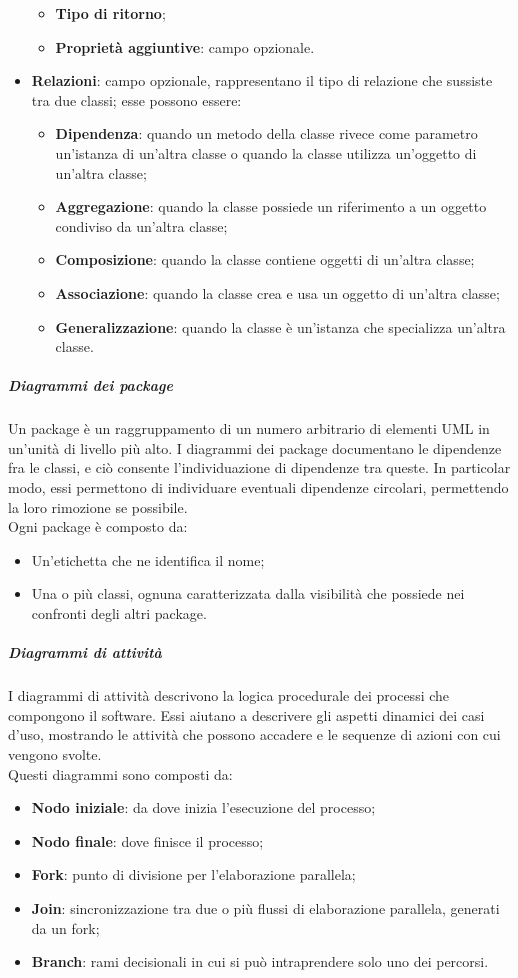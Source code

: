 \documentclass[../norme-di-progetto.tex]{subfiles}
\begin{document}
\begin{itemize}
\begin{itemize}
      \item \textbf{Tipo di ritorno};
      \item \textbf{Proprietà aggiuntive}: campo opzionale.
    \end{itemize}
  \item \textbf{Relazioni}: campo opzionale, rappresentano il tipo di relazione che sussiste tra due classi; esse possono essere:
  \begin{itemize}
    \item \textbf{Dipendenza}: quando un metodo della classe rivece come parametro un'istanza di un'altra classe o quando la classe utilizza un'oggetto di un'altra classe;
    \item \textbf{Aggregazione}: quando la classe possiede un riferimento a un oggetto condiviso da un'altra classe;
    \item \textbf{Composizione}: quando la classe contiene oggetti di un'altra classe;
    \item \textbf{Associazione}: quando la classe crea e usa un oggetto di un'altra classe;
    \item \textbf{Generalizzazione}: quando la classe è un'istanza che specializza un'altra classe.
  \end{itemize}
\end{itemize}

\subparagraph*{Diagrammi dei package}
Un package è un raggruppamento di un numero arbitrario di elementi UML in un'unità di livello più alto. I diagrammi dei package documentano le dipendenze fra le classi, e ciò consente l'individuazione di dipendenze tra queste. In particolar modo, essi permettono di individuare eventuali dipendenze circolari, permettendo la loro rimozione se possibile. \\
Ogni package è composto da:
\begin{itemize}
  \item Un'etichetta che ne identifica il nome;
  \item Una o più classi, ognuna caratterizzata dalla visibilità che possiede nei confronti degli altri package.
\end{itemize}

\subparagraph*{Diagrammi di attività}
I diagrammi di attività descrivono la logica procedurale dei processi che compongono il software. Essi aiutano a descrivere gli aspetti dinamici dei casi d'uso, mostrando le attività che possono accadere e le sequenze di azioni con cui vengono svolte. \\
Questi diagrammi sono composti da:
\begin{itemize}
  \item \textbf{Nodo iniziale}: da dove inizia l'esecuzione del processo;
  \item \textbf{Nodo finale}: dove finisce il processo;
  \item \textbf{Fork}: punto di divisione per l'elaborazione parallela;
  \item \textbf{Join}: sincronizzazione tra due o più flussi di elaborazione parallela, generati da un fork;
  \item \textbf{Branch}: rami decisionali in cui si può intraprendere solo uno dei percorsi.
\end{itemize}
\end{document}
